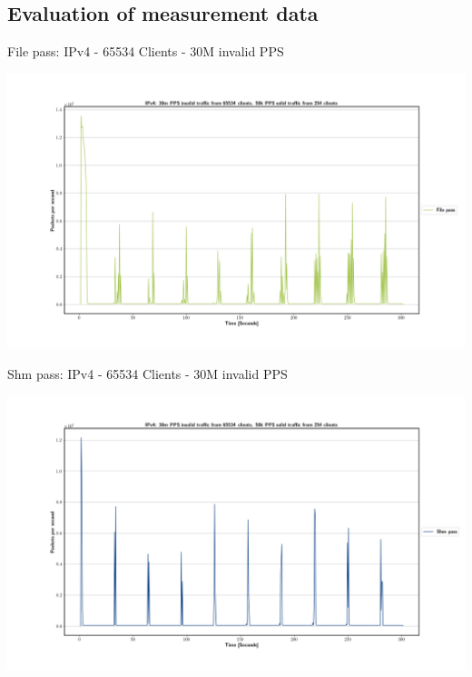 \documentclass[11pt,english,table,dvipsnames]{beamer}
\begin{document}
\subsection{Evaluation of measurement data}
\begin{frame}{File pass: IPv4 - 65534 Clients - 30M invalid PPS}
    \begin{center}
        \includegraphics[width=1.\linewidth]{images/IPv4_30m_65534_1_file_pass.png}
    \end{center}
\end{frame}

\begin{frame}{Shm pass: IPv4 - 65534 Clients - 30M invalid PPS}
    \begin{center}
        \includegraphics[width=1.\linewidth]{images/IPv4_30m_65534_1_shm_pass.png}
    \end{center}
\end{frame}
\end{document}
